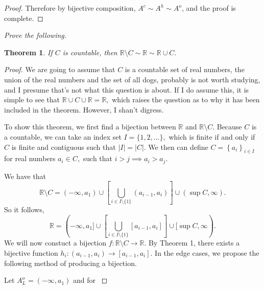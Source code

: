 \documentclass[letter]{article}
\newtheorem{theorem}{Theorem}
\newenvironment{menumerate}{%
  \edef\backupindent{\the\parindent}%
  \enumerate%
  \setlength{\parindent}{\backupindent}%
}{\endenumerate}
\begin{document}
\begin{menumerate}
\begin{menumerate}
\begin{proof}
	 			 	Therefore by bijective composition, $A^c \sim A^h \sim A^o$, and the proof is complete. 

	 			 \end{proof}

 			 \item \textit{Prove the following.} 
 			 	\begin{theorem}
 			 	If $C$ is countable, then $\mathbb{R}\setminus C \sim \mathbb{R} \sim \mathbb{R} \cup C.$
 			 	\end{theorem}
 			 	\begin{proof}
 			 		We are going to assume that $C$ is a countable set of real numbers, the union of the real numbers and the set of all dogs, probably is not worth studying, and I presume that's not what this question is about. If I do assume this, it is simple to see that $\mathbb{R} \cup C \cup \mathbb{R} = \mathbb{R},$ which raises the question as to why it has been included in the theorem. However, I shan't digress. 

 			 		To show this theorem, we first find a bijection between $\mathbb{R}$ and $\mathbb{R} \setminus C$. Because $C$ is a countable, we can take an index set $I = \{1,2,\dots\},$ which is finite if and only if $C$ is finite and contiguous such that $|I| = |C|.$ We then can define $C = \left\{a_i \right\}_{i \in I}$ for real numbers $a_i \in C,$ such that $i > j \implies a_i > a_j$.

 			 		We have that $$\mathbb{R}\setminus C = (-\infty,a_1)\cup \left[\bigcup_{i\in I \setminus \{1\}}(a_{i-1},a_i)\right]\cup (\sup C,\infty).$$ So it follows,
 			 		 $$\mathbb{R} = (-\infty,a_1]\cup \left[\bigcup_{i\in I \setminus \{1\}}[a_{i-1},a_i]\right]\cup [\sup C,\infty).$$ We will now constuct a bijection $f:\mathbb{R}\setminus C \to \mathbb{R}.$ By Theorem 1, there exists a bijective function $h_i : (a_{i-1}, a_i) \to [a_{i-1}, a_i].$ In the edge cases, we propose the following method of producing a bijection.

 			 		 Let $A_L^o = (-\infty, a_1)$ and for $$
 			 	\end{proof}
		 \end{menumerate} 
\end{menumerate}
\end{document}

